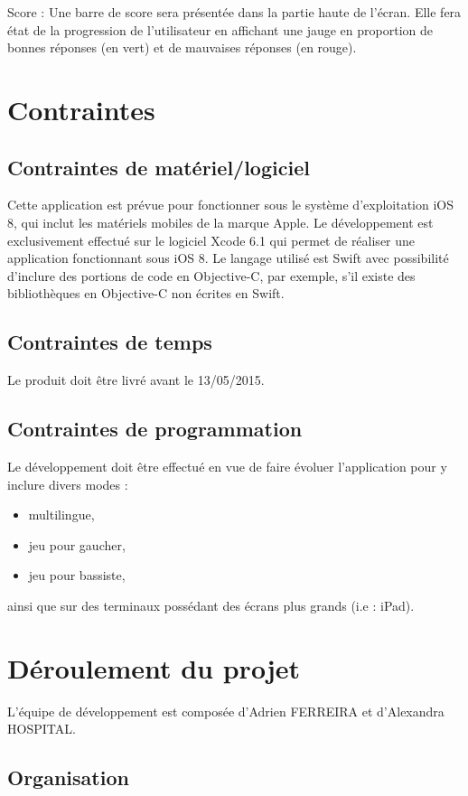 \documentclass{scrreprt}
\begin{document}
Score : Une barre de score sera présentée dans la partie haute de l’écran. Elle fera état de la progression de l’utilisateur en affichant une jauge en proportion de bonnes réponses (en vert) et de mauvaises réponses (en rouge).

\chapter{Contraintes}
\section{Contraintes de matériel/logiciel}
Cette application est prévue pour fonctionner sous le système d’exploitation iOS 8, qui inclut les matériels mobiles de la marque Apple.
Le développement est exclusivement effectué sur le logiciel Xcode 6.1 qui permet de réaliser une application fonctionnant sous iOS 8.
Le langage utilisé est Swift avec possibilité d’inclure des portions de code en Objective-C, par exemple, s’il existe des bibliothèques en Objective-C non écrites en Swift.


\section{Contraintes de temps}
Le produit doit être livré avant le 13/05/2015.


\section{Contraintes de programmation}
Le développement doit être effectué en vue de faire évoluer l’application pour y inclure divers modes :
\begin{itemize}
\item multilingue,
\item jeu pour gaucher,
\item jeu pour bassiste,
\end{itemize}
\setlength{\parindent}{1cm}ainsi que sur des terminaux possédant des écrans plus grands (i.e : iPad).


\chapter{Déroulement du projet}

L'équipe de développement est composée d'Adrien FERREIRA et d'Alexandra HOSPITAL.

\section{Organisation}
\end{document}
